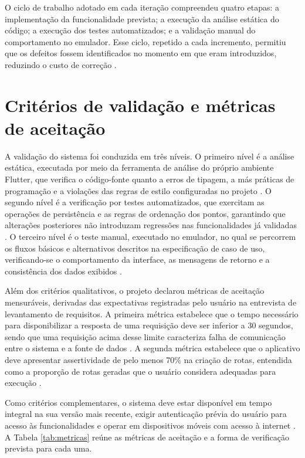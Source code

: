 O ciclo de trabalho adotado em cada iteração compreendeu quatro etapas: a implementação da funcionalidade prevista; a execução da análise estática do código; a execução dos testes automatizados; e a validação manual do comportamento no emulador. Esse ciclo, repetido a cada incremento, permitiu que os defeitos fossem identificados no momento em que eram introduzidos, reduzindo o custo de correção \cite{sommerville2019}.

\section{Critérios de validação e métricas de aceitação}

A validação do sistema foi conduzida em três níveis. O primeiro nível é a análise estática, executada por meio da ferramenta de análise do próprio ambiente Flutter, que verifica o código-fonte quanto a erros de tipagem, a más práticas de programação e a violações das regras de estilo configuradas no projeto \cite{flutter2024}. O segundo nível é a verificação por testes automatizados, que exercitam as operações de persistência e as regras de ordenação dos pontos, garantindo que alterações posteriores não introduzam regressões nas funcionalidades já validadas \cite{sommerville2019}. O terceiro nível é o teste manual, executado no emulador, no qual se percorrem os fluxos básicos e alternativos descritos na especificação de caso de uso, verificando-se o comportamento da interface, as mensagens de retorno e a consistência dos dados exibidos \cite{sriEspecUC2026}.

Além dos critérios qualitativos, o projeto declarou métricas de aceitação mensuráveis, derivadas das expectativas registradas pelo usuário na entrevista de levantamento de requisitos. A primeira métrica estabelece que o tempo necessário para disponibilizar a resposta de uma requisição deve ser inferior a 30 segundos, sendo que uma requisição acima desse limite caracteriza falha de comunicação entre o sistema e a fonte de dados \cite{sriEspecComp2025}. A segunda métrica estabelece que o aplicativo deve apresentar assertividade de pelo menos 70\% na criação de rotas, entendida como a proporção de rotas geradas que o usuário considera adequadas para execução \cite{sriPedido2025}.

Como critérios complementares, o sistema deve estar disponível em tempo integral na sua versão mais recente, exigir autenticação prévia do usuário para acesso às funcionalidades e operar em dispositivos móveis com acesso à internet \cite{sriEspecComp2025}. A Tabela \ref{tab:metricas} reúne as métricas de aceitação e a forma de verificação prevista para cada uma.

